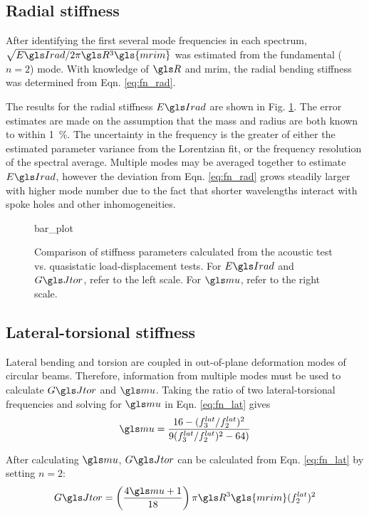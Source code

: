 \documentclass[../thesis.tex]{subfiles}
\begin{document}
\subsection{Radial stiffness}

After identifying the first several mode frequencies in each spectrum, $\sqrt{\EIr/2\pi \R^3 \gls{mrim}}$ was estimated from the fundamental ($n=2$) mode. With knowledge of $\R$ and \gls{mrim}, the radial bending stiffness was determined from Eqn. \eqref{eq:fn_rad}.

The results for the radial stiffness $\EIr$ are shown in Fig. \ref{fig:bar}. The error estimates are made on the assumption that the mass and radius are both known to within \SI{1}{\percent}. The uncertainty in the frequency is the greater of either the estimated parameter variance from the Lorentzian fit, or the frequency resolution of the spectral average. Multiple modes may be averaged together to estimate $\EIr$, however the deviation from Eqn. \eqref{eq:fn_rad} grows steadily larger with higher mode number due to the fact that shorter wavelengths interact with spoke holes and other inhomogeneities.

\begin{figure}
{bar_plot}
\caption{Comparison of stiffness parameters calculated from the acoustic test vs. quasistatic load-displacement tests. For $\EIr$ and $\GJ$, refer to the left scale. For $\m$, refer to the right scale.}
\label{fig:bar}
\end{figure}

\subsection{Lateral-torsional stiffness}

Lateral bending and torsion are coupled in out-of-plane deformation modes of circular beams. Therefore, information from multiple modes must be used to calculate $\GJ$ and $\m$. Taking the ratio of two lateral-torsional frequencies and solving for $\m$ in Eqn. \eqref{eq:fn_lat} gives
  \begin{equation}\label{eq:mu}
  \m = \frac{16 - (f_3^{lat}/f_2^{lat})^2}{9(f_3^{lat}/f_2^{lat})^2 - 64)}
  \end{equation}

After calculating $\m$, $\GJ$ can be calculated from Eqn. \eqref{eq:fn_lat} by setting $n=2$:
  \begin{equation}\label{eq:GJ}
  \GJ = \left(\frac{4\m + 1}{18} \right ) \pi \R^3 \gls{mrim} (f_2^{lat})^2
  \end{equation}
\end{document}
